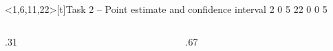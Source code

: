 \documentclass[12pt,aspectratio=169]{beamer}
\newif\ifReference
\begin{document}
\begin{frame}<1,6,11,22>[t]{Task 2 -- Point estimate and confidence interval}
\Referencetrue
\expandafter\def\csname Input5\endcsname{2}
\expandafter\def\csname Input6\endcsname{0}
\expandafter\def\csname Input7\endcsname{5}
\expandafter\def\csname Input9\endcsname{22}
\expandafter\def\csname Input11\endcsname{0}
\expandafter\def\csname Input13\endcsname{0}
\expandafter\def\csname Input15\endcsname{5}
\vspace{-7mm}
\begin{columns}[T,onlytextwidth]
\begin{column}{.31\textwidth}\TaskTwoReference\end{column}
\begin{column}{.67\textwidth}\TaskTwoWorkingTable\end{column}
\end{columns}
\end{frame}
\end{document}
